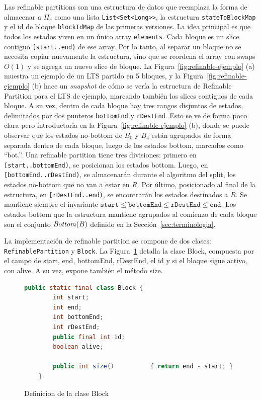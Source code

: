 Las refinable partitions son una estructura de datos que reemplaza la forma de almacenar a $\Pi_s$ como una lista \texttt{List<Set<Long>>}, la estructura \texttt{stateToBlockMap} y el id de bloque \texttt{blockIdMap} de las primeras versiones. La idea principal es que todos los estados viven en un único array \texttt{elements}. Cada bloque es un slice contiguo \texttt{[start..end)} de ese array. Por lo tanto, al separar un bloque no se necesita copiar nuevamente la estructura, sino que se reordena el array con swaps $O(1)$ y se agrega un nuevo slice de bloque. La Figura~\ref{fig:refinable-ejemplo} (a) muestra un ejemplo de un LTS partido en 5 bloques, y la Figura~\ref{fig:refinable-ejemplo} (b) hace un \textit{snapshot} de cómo se vería la estructura de Refinable Partition para el LTS de ejemplo, marcando también los slices contiguos de cada bloque. A su vez, dentro de cada bloque hay tres rangos disjuntos de estados, delimitados por dos punteros \texttt{bottomEnd} y \texttt{rDestEnd}. Esto se ve de forma poco clara pero introductoria en la Figura~\ref{fig:refinable-ejemplo} (b), donde se puede observar que los estados no-bottom de $B_0$ y $B_4$ están agrupados de forma separada dentro de cada bloque, luego de los estados bottom, marcados como ``bot.''. Una refinable partition tiene tres divisiones: primero en \texttt{[start..bottomEnd)}, se posicionan los estados bottom. Luego, en \texttt{[bottomEnd..rDestEnd)}, se almacenarán durante el algoritmo del split, los estados no-bottom que no van a estar en $R$. Por último, posicionado al final de la estructura, en \texttt{[rDestEnd..end)}, se encontrarán los estados destinados a $R$. Se mantiene siempre el invariante $\mathtt{start} \le \mathtt{bottomEnd} \le \mathtt{rDestEnd} \le \mathtt{end}$. Los estados bottom que la estructura mantiene agrupados al comienzo de cada bloque son el conjunto $\mathit{Bottom}(B)$ definido en la Sección~\ref{sec:terminologia}.

La implementación de refinable partition se compone de dos clases: \texttt{RefinablePartition} y \texttt{Block}. La Figura~\ref{fig:class-block} detalla la clase Block, compuesta por el campo de start, end, bottomEnd, rDestEnd, el id y si el bloque sigue activo, con alive. A su vez, expone también el método size.

\begin{figure}[htbp]
  \centering
  \begin{minipage}{\linewidth}
  \begin{lstlisting}[language=Java, numbers=none]
    public static final class Block {
        int start;
        int end;
        int bottomEnd;
        int rDestEnd;
        public final int id;
        boolean alive;

        public int size()          { return end - start; }
    }
  \end{lstlisting}
  \end{minipage}
  \caption{Definicion de la clase Block}
  \label{fig:class-block}
\end{figure}

